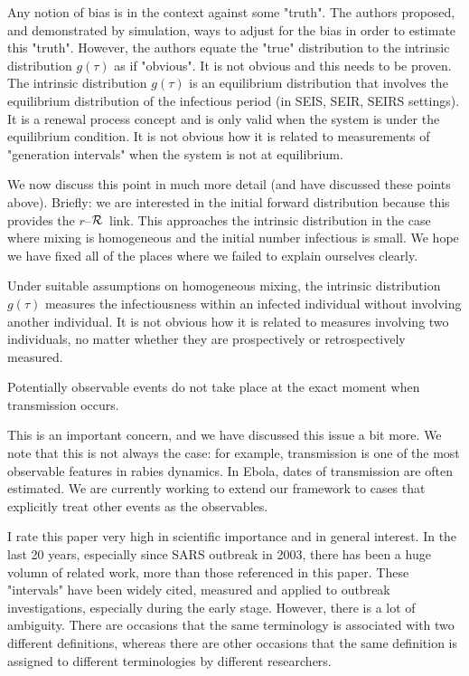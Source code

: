 \documentclass[12pt]{article}
\newcommand{\rR}{\mbox{$r$--$\cal R$}}
\newcommand{\revtext}{\textsf}
\begin{document}
\revtext{
Any notion of bias is in the context against some "truth". The authors
proposed, and demonstrated by simulation, ways to adjust for the bias in
order to estimate this "truth". However, the authors equate the "true"
distribution to the intrinsic distribution $g(\tau)$ as if "obvious". It is not
obvious and this needs to be proven.
The intrinsic distribution $g(\tau)$ is an equilibrium distribution that
involves the equilibrium distribution of the infectious period (in SEIS,
SEIR, SEIRS settings). It is a renewal process concept and is only
valid when the system is under the equilibrium condition. It is not
obvious how it is related to measurements of "generation intervals"
when the system is not at equilibrium.
}

We now discuss this point in much more detail (and have discussed these points above). Briefly: we are interested in the initial forward distribution because this provides the \rR\ link. This approaches the intrinsic distribution in the case where mixing is homogeneous and the initial number infectious is small. We hope we have fixed all of the places where we failed to explain ourselves clearly.

\revtext{
 Under suitable assumptions on homogeneous mixing, the intrinsic
distribution $g(\tau)$ measures the infectiousness within an infected individual without involving another individual. It is not obvious how it
is related to measures involving two individuals, no matter whether
they are prospectively or retrospectively measured.
}

\revtext{
Potentially observable events do not take place at the exact moment
when transmission occurs.
}

This is an important concern, and we have discussed this issue a bit more. We note that this is not always the case: for example, transmission is one of the most observable features in rabies dynamics. In Ebola, dates of transmission are often estimated. We are currently working to extend our framework to cases that explicitly treat other events as the observables.

\revtext{
I rate this paper very high in scientific importance and in general interest.
In the last 20 years, especially since SARS outbreak in 2003, there has
been a huge volumn of related work, more than those referenced in this
paper. These "intervals" have been widely cited, measured and applied to
outbreak investigations, especially during the early stage. However, there
is a lot of ambiguity. There are occasions that the same terminology is
associated with two different definitions, whereas there are other occasions
that the same definition is assigned to different terminologies by different
researchers.
}
\end{document}
